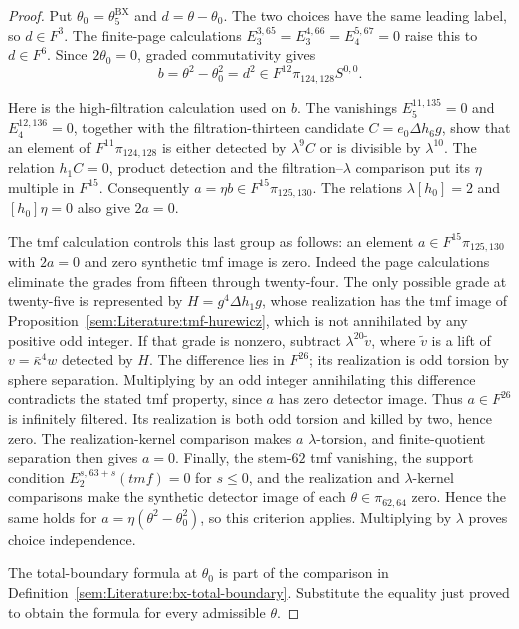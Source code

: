 \begin{proof}
Put $\theta_0=\theta_5^{\mathrm{BX}}$ and $d=\theta-\theta_0$.
The two choices have the same leading label, so $d\in F^3$.
The finite-page calculations
$E_3^{3,65}=E_3^{4,66}=E_4^{5,67}=0$ raise this to $d\in F^6$.
Since $2\theta_0=0$, graded commutativity gives
\[
 b=\theta^2-\theta_0^2=d^2\in F^{12}\pi_{124,128}S^{0,0}.
\]

Here is the high-filtration calculation used on $b$. The vanishings
$E_5^{11,135}=0$ and $E_4^{12,136}=0$, together with the
filtration-thirteen candidate $C=e_0\Delta h_6g$, show that an element
of $F^{11}\pi_{124,128}$ is either detected by $\lambda^9C$ or is
divisible by $\lambda^{10}$. The relation $h_1C=0$, product detection
and the filtration--$\lambda$ comparison put its $\eta$ multiple in
$F^{15}$. Consequently $a=\eta b\in F^{15}\pi_{125,130}$.
The relations $\lambda[h_0]=2$ and $[h_0]\eta=0$ also give $2a=0$.

The tmf calculation controls this last group as follows:
an element $a\in F^{15}\pi_{125,130}$ with $2a=0$ and zero synthetic
tmf image is zero. Indeed the page calculations eliminate the grades
from fifteen through twenty-four. The only possible grade at twenty-five
is represented by $H=g^4\Delta h_1g$, whose realization has the
tmf image of Proposition~\ref{sem:Literature:tmf-hurewicz}, which is
not annihilated by any positive odd integer. If that grade is nonzero,
subtract $\lambda^{20}\widetilde v$, where $\widetilde v$ is a lift of
$v=\bar\kappa^4w$ detected by $H$. The difference lies in $F^{26}$;
its realization is odd torsion by sphere separation. Multiplying by
an odd integer annihilating this difference contradicts the stated
tmf property, since $a$ has zero detector image. Thus $a\in F^{26}$
is infinitely filtered. Its realization is both odd torsion and killed
by two, hence zero. The realization-kernel comparison makes $a$
$\lambda$-torsion, and finite-quotient separation then gives $a=0$.
Finally, the stem-$62$ tmf vanishing, the support condition
$E_2^{s,63+s}(\mathit{tmf})=0$ for $s\le0$, and the realization and
$\lambda$-kernel comparisons make the synthetic detector image of
each $\theta\in\pi_{62,64}$ zero. Hence the same holds for
$a=\eta(\theta^2-\theta_0^2)$, so this criterion applies.
Multiplying by $\lambda$ proves choice independence.

The total-boundary formula at $\theta_0$ is part of the comparison in
Definition~\ref{sem:Literature:bx-total-boundary}. Substitute the equality
just proved to obtain the formula for every admissible $\theta$.
\end{proof}

